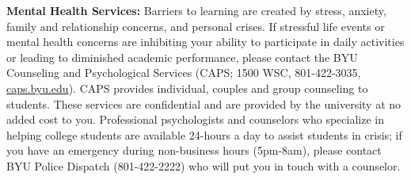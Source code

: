 \documentclass[11pt]{article}
\begin{document}
\textbf{\large Mental Health Services:}
Barriers to learning are created by stress, anxiety, family and relationship concerns, and personal
crises. If stressful life events or mental health concerns are inhibiting your ability to
participate in daily activities or leading to diminished academic performance, please contact the
BYU Counseling and Psychological Services (CAPS; 1500 WSC, 801-422-3035, \url{caps.byu.edu}). CAPS
provides individual, couples and group counseling to students. These services are confidential and
are provided by the university at no added cost to you. Professional psychologists and counselors
who specialize in helping college students are available 24-hours a day to assist students in
crisis; if you have an emergency during non-business hours (5pm-8am), please contact BYU Police
Dispatch (801-422-2222) who will put you in touch with a counselor.
\end{document}
